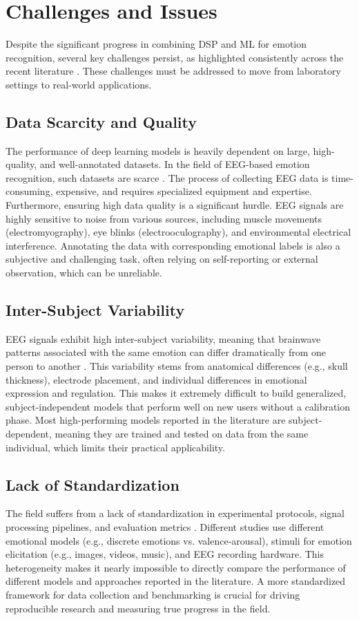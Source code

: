 \documentclass[conference]{IEEEtran}
\begin{document}
\section{Challenges and Issues}
Despite the significant progress in combining DSP and ML for emotion recognition, several key challenges persist, as highlighted consistently across the recent literature \cite{b1, b3, b5}. These challenges must be addressed to move from laboratory settings to real-world applications.

\subsection*{Data Scarcity and Quality}
The performance of deep learning models is heavily dependent on large, high-quality, and well-annotated datasets. In the field of EEG-based emotion recognition, such datasets are scarce \cite{b5}. The process of collecting EEG data is time-consuming, expensive, and requires specialized equipment and expertise. Furthermore, ensuring high data quality is a significant hurdle. EEG signals are highly sensitive to noise from various sources, including muscle movements (electromyography), eye blinks (electrooculography), and environmental electrical interference. Annotating the data with corresponding emotional labels is also a subjective and challenging task, often relying on self-reporting or external observation, which can be unreliable.

\subsection*{Inter-Subject Variability}
EEG signals exhibit high inter-subject variability, meaning that brainwave patterns associated with the same emotion can differ dramatically from one person to another \cite{b3}. This variability stems from anatomical differences (e.g., skull thickness), electrode placement, and individual differences in emotional expression and regulation. This makes it extremely difficult to build generalized, subject-independent models that perform well on new users without a calibration phase. Most high-performing models reported in the literature are subject-dependent, meaning they are trained and tested on data from the same individual, which limits their practical applicability.

\subsection*{Lack of Standardization}
The field suffers from a lack of standardization in experimental protocols, signal processing pipelines, and evaluation metrics \cite{b1}. Different studies use different emotional models (e.g., discrete emotions vs. valence-arousal), stimuli for emotion elicitation (e.g., images, videos, music), and EEG recording hardware. This heterogeneity makes it nearly impossible to directly compare the performance of different models and approaches reported in the literature. A more standardized framework for data collection and benchmarking is crucial for driving reproducible research and measuring true progress in the field.
\end{document}
